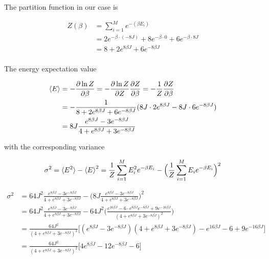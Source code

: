 \documentclass[11pt]{article}
\begin{document}
\begin{flushleft}

The partition function in our case is

\begin{align*}
Z(\beta) &= \sum_{i=1}^M e^{-(\beta E_i)}\\
&= 2 e^{-\beta \cdot (-8J)} + 8 e^{-\beta \cdot 0} + 6 e^{- \beta \cdot 8J}\\
&= 8 + 2e^{8 \beta J} + 6 e^{-8 \beta J}\\
\end{align*}


The energy expectation value

\begin{align*}
\braket{E} & = - \frac{\partial \ln Z}{\partial \beta}= - \frac{\partial \ln Z}{\partial Z} \frac{\partial Z}{\partial \beta} = - \frac{1}{Z} \frac{\partial Z}{\partial \beta}\\
& = - \frac{1}{8 + 2e^{8 \beta J} + 6 e^{-8 \beta J}} ( 8J \cdot 2e^{8 \beta J} - 8 J \cdot 6 e^{-8 \beta J})\\
&= 8J \frac{e^{8 \beta J} - 3 e^{-8 \beta J}}{4 + e^{8 \beta J} + 3 e^{-8 \beta J}}
\end{align*}

with the corresponding variance

\begin{align*}
\sigma^2 = \braket{E^2} - \braket{E}^2 = \frac{1}{Z} \sum_{i=1}^M E_i^2 e^{- \beta E_i} - \Big(
\frac{1}{Z} \sum_{i=1}^M E_i e^{- \beta E_i} 
\Big)^2
\end{align*}

\begin{align*}
\sigma^2 &= 64J^2 \frac{e^{8 \beta J} - 3 e^{-8 \beta J}}{4 + e^{8 \beta J} + 3 e^{-8 \beta J}}
- \big( 8J \frac{e^{8 \beta J} - 3 e^{-8 \beta J}}{4 + e^{8 \beta J} + 3 e^{-8 \beta J}}
\big)^2\\
&= 64J^2 \frac{e^{8 \beta J} - 3 e^{-8 \beta J}}{4 + e^{8 \beta J} + 3 e^{-8 \beta J}}
- 64J^2\big(
\frac{e^{16 \beta J} - 6 \cdot e^{8 \beta J}e^{-8 \beta J} + 9 e^{-16 \beta J}}{(4 + e^{8 \beta J} + 3 e^{-8 \beta J})^2}
\big)\\
&= 
\frac{64J^2}{(4 + e^{8 \beta J} + 3 e^{-8 \beta J})^2}
\Big[
(e^{8 \beta J} - 3 e^{-8 \beta J})(4 + e^{8 \beta J} + 3 e^{-8 \beta J})
-e^{16 \beta J} - 6  + 9 e^{-16 \beta J}
\Big]\\
&= \frac{64J^2}{(4 + e^{8 \beta J} + 3 e^{-8 \beta J})^2}
\Big[
4 e^{8 \beta J} 
- 12 e^{-8 \beta J}  - 6 
\Big] \\
\end{align*}


\end{flushleft}
\end{document}
